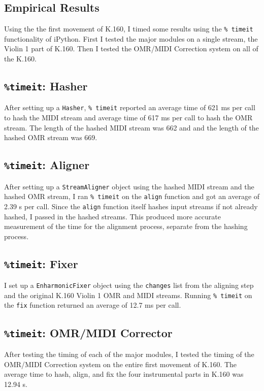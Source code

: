 \subsection{Empirical Results}
Using the the first movement of K.160, I timed some results using the \texttt{\% timeit} functionality of iPython. First I tested the major modules on a single stream, the Violin 1 part of K.160. Then I tested the OMR/MIDI Correction system on all of the K.160.

\subsection{\texttt{\%timeit}: Hasher}
After setting up a \texttt{Hasher}, \texttt{\% timeit}  reported an average time of 621 ms per call to hash the MIDI stream and average time of 617 ms per call to hash the OMR stream. The length of the hashed MIDI stream was 662 and and the length of the hashed OMR stream was 669. 

\subsection{\texttt{\%timeit}: Aligner}
After setting up a \texttt{StreamAligner} object using the hashed MIDI stream and the hashed OMR stream, I ran \texttt{\% timeit} on the \texttt{align} function and got an average of 2.39 s per call. Since the \texttt{align} function itself hashes input streams if not already hashed, I passed in the hashed streams. This produced more accurate measurement of the time for the alignment process, separate from the hashing process.

\subsection{\texttt{\%timeit}: Fixer}
I set up a \texttt{EnharmonicFixer} object using the \texttt{changes} list from the aligning step and the original K.160 Violin 1 OMR and MIDI streams. Running \texttt{\% timeit} on the \texttt{fix} function returned an average of 12.7 ms per call. 

\subsection{\texttt{\%timeit}: OMR/MIDI Corrector}
After testing the timing of each of the major modules, I tested the timing of the OMR/MIDI Correction system on the entire first movement of K.160. The average time to hash, align, and fix the four instrumental parts in K.160 was 12.94 s. 

